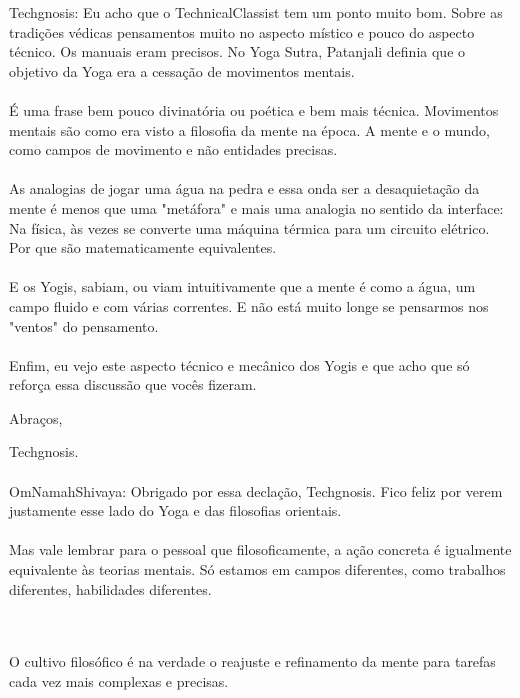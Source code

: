 \documentclass[11pt]{article}
\begin{document}
Techgnosis: Eu acho que o TechnicalClassist tem um ponto muito bom. Sobre as tradições védicas pensamentos muito no aspecto místico e pouco do aspecto técnico. Os manuais eram precisos. No Yoga Sutra, Patanjali definia que o objetivo da Yoga era a cessação de movimentos mentais.\\\\

É uma frase bem pouco divinatória ou poética e bem mais técnica. Movimentos mentais são como era visto a filosofia da mente na época. A mente e o mundo, como campos de movimento e não entidades precisas.\\\\

As analogias de jogar uma água na pedra e essa onda ser a desaquietação da mente é menos que uma "metáfora" e mais uma analogia no sentido da interface: Na física, às vezes se converte uma máquina térmica para um circuito elétrico. Por que são matematicamente equivalentes.\\\\

E os Yogis, sabiam, ou viam intuitivamente que a mente é como a água, um campo fluido e com várias correntes. E não está muito longe se pensarmos nos "ventos" do pensamento.\\\\

Enfim, eu vejo este aspecto técnico e mecânico dos Yogis e que acho que só reforça essa discussão que vocês fizeram.

Abraços,

Techgnosis.
\\\\

OmNamahShivaya: Obrigado por essa declação, Techgnosis. Fico feliz por verem justamente esse lado do Yoga e das filosofias orientais.\\\\ 

Mas vale lembrar para o pessoal que filosoficamente, a ação concreta é igualmente equivalente às teorias mentais. Só estamos em campos diferentes, como trabalhos diferentes, habilidades diferentes.\\\\\

O cultivo filosófico é na verdade o reajuste e refinamento da mente para tarefas cada vez mais complexas e precisas. \\\\\
\end{document}
